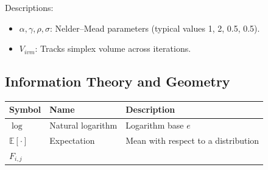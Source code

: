 \documentclass[
  10pt,
]{article}
\providecommand{\tightlist}{%
  \setlength{\itemsep}{0pt}\setlength{\parskip}{0pt}}
\begin{document}
Descriptions:

\begin{itemize}
\tightlist
\item
  \(\alpha,\gamma,\rho,\sigma\): Nelder--Mead parameters (typical values
  1, 2, 0.5, 0.5).
\item
  \(V_{ivm}\): Tracks simplex volume across iterations.
\end{itemize}

\hypertarget{information-theory-and-geometry}{%
\subsection{Information Theory and
Geometry}\label{information-theory-and-geometry}}

\begin{longtable}[]{@{}lll@{}}
\toprule
\begin{minipage}[b]{0.30\columnwidth}\raggedright
Symbol\strut
\end{minipage} & \begin{minipage}[b]{0.30\columnwidth}\raggedright
Name\strut
\end{minipage} & \begin{minipage}[b]{0.30\columnwidth}\raggedright
Description\strut
\end{minipage}\tabularnewline
\midrule
\endhead
\begin{minipage}[t]{0.30\columnwidth}\raggedright
\(\log\)\strut
\end{minipage} & \begin{minipage}[t]{0.30\columnwidth}\raggedright
Natural logarithm\strut
\end{minipage} & \begin{minipage}[t]{0.30\columnwidth}\raggedright
Logarithm base \(e\)\strut
\end{minipage}\tabularnewline
\begin{minipage}[t]{0.30\columnwidth}\raggedright
\(\mathbb{E}[\cdot]\)\strut
\end{minipage} & \begin{minipage}[t]{0.30\columnwidth}\raggedright
Expectation\strut
\end{minipage} & \begin{minipage}[t]{0.30\columnwidth}\raggedright
Mean with respect to a distribution\strut
\end{minipage}\tabularnewline
\begin{minipage}[t]{0.30\columnwidth}\raggedright
\(F_{i,j}\)\strut
\end{minipage} & \begin{minipage}[t]{0.30\columnwidth}\raggedright

\end{minipage}
\end{longtable}
\end{document}
